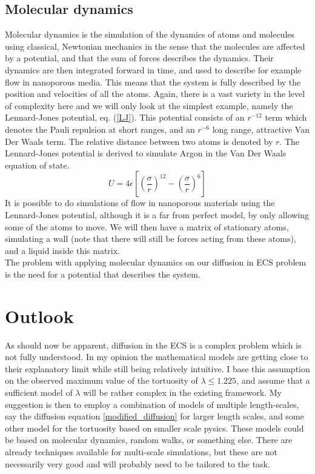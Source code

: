 \documentclass[a4paper,english, 12pt, twoside]{article}
\begin{document}
\subsection{Molecular dynamics}\label{MD}
Molecular dynamics is the simulation of the dynamics of atoms and molecules using classical, Newtonian mechanics in the sense that the molecules are affected by a potential, and that the sum of forces describes the dynamics. 
Their dynamics are then integrated forward in time, and used to describe for example flow in nanoporous media. 
This means that the system is fully described by the position and velocities of all the atoms. 
Again, there is a vast variety in the level of complexity here and we will only look at the simplest example, namely the Lennard-Jones potential, eq. (\ref{LJ}). 
This potential consists of an $r^{-12}$ term which denotes the Pauli repulsion at short ranges, and an $r^{-6}$ long range, attractive Van Der Waals term. 
The relative distance between two atoms is denoted by $r$. 
The Lennard-Jones potential is derived to simulate Argon in the Van Der Waals equation of state.
\begin{equation}\label{LJ}
 U = 4\epsilon\left[\left(\frac{\sigma}{r}\right)^{12}-\left(\frac{\sigma}{r}\right)^{6}\right]
\end{equation}
It is possible to do simulations of flow in nanoporous materials using the Lennard-Jones potential, although it is a far from perfect model, by only allowing some of the atoms to move. 
We will then have a matrix of stationary atoms, simulating a wall (note that there will still be forces acting from these atoms), and a liquid inside this matrix. \\
The problem with applying molecular dynamics on our diffusion in ECS problem is the need for a potential that describes the system. 


\section{Outlook}
As should now be apparent, diffusion in the ECS is a complex problem which is not fully understood. 
In my opinion the mathematical models are getting close to their explanatory limit while still being relatively intuitive. 
I base this assumption on the observed maximum value of the tortuosity of $\lambda\leq 1.225$, and assume that a sufficient model of $\lambda$ will be rather complex in the existing framework. 
My suggestion is then to employ a combination of models of multiple length-scales, say the diffusion equation \ref{modified_diffusion} for larger length scales, and some other model for the tortuosity based on smaller scale pysics. 
These models could be based on molecular dynamics, random walks, or something else. 
There are already techniques available for multi-scale simulations, but these are not necessarily very good and will probably need to be tailored to the task.


\printbibliography
\end{document}
